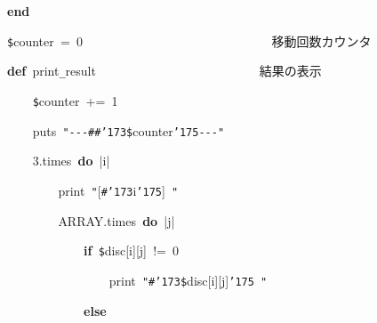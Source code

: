 \documentclass[a4paper,10pt]{article}
\def\mc{\relax}
\begin{document}
\noindent
\mbox{}\textbf{end}

\noindent
\mbox{}\hfill

\noindent
\mbox{}{\tt\$}counter{\tt\mc \ }={\tt\mc \ }0{\tt\mc \ }{\tt\mc \ }{\tt\mc \ }{\tt\mc \ }{\tt\mc \ }{\tt\mc \ }{\tt\mc \ }{\tt\mc \ }{\tt\mc \ }{\tt\mc \ }{\tt\mc \ }{\tt\mc \ }{\tt\mc \ }{\tt\mc \ }{\tt\mc \ }{\tt\mc \ }{\tt\mc \ }{\tt\mc \ }{\tt\mc \ }{\tt\mc \ }{\tt\mc \ }{\tt\mc \ }{\tt\mc \ }{\tt\mc \ }{\tt\mc \ }{\tt\mc \ }{\tt\mc \ }{\tt\mc \ }\rm\mc {\tt\#} \ 移動回数カウンタ \hfill 
\tt\mc 

\noindent
\mbox{}\hfill

\noindent
\mbox{}\textbf{def}{\tt\mc \ }print{\tt\_}result{\tt\mc \ }{\tt\mc \ }{\tt\mc \ }{\tt\mc \ }{\tt\mc \ }{\tt\mc \ }{\tt\mc \ }{\tt\mc \ }{\tt\mc \ }{\tt\mc \ }{\tt\mc \ }{\tt\mc \ }{\tt\mc \ }{\tt\mc \ }{\tt\mc \ }{\tt\mc \ }{\tt\mc \ }{\tt\mc \ }{\tt\mc \ }{\tt\mc \ }{\tt\mc \ }{\tt\mc \ }{\tt\mc \ }{\tt\mc \ }\rm\mc {\tt\#} \ 結果の表示 \hfill 
\tt\mc 

\noindent
\mbox{}{\tt\mc \ }{\tt\mc \ }{\tt\mc \ }{\tt\mc \ }{\tt\$}counter{\tt\mc \ }+={\tt\mc \ }1

\noindent
\mbox{}{\tt\mc \ }{\tt\mc \ }{\tt\mc \ }{\tt\mc \ }puts{\tt\mc \ }{\tt "}{\tt -}{\tt -}{\tt -}{\tt\#}{\tt\#}{\tt\char'173}{\tt\$}counter{\tt\char'175}{\tt -}{\tt -}{\tt -}{\tt "}

\noindent
\mbox{}{\tt\mc \ }{\tt\mc \ }{\tt\mc \ }{\tt\mc \ }3.times{\tt\mc \ }\textbf{do}{\tt\mc \ }|i|

\noindent
\mbox{}{\tt\mc \ }{\tt\mc \ }{\tt\mc \ }{\tt\mc \ }{\tt\mc \ }{\tt\mc \ }{\tt\mc \ }{\tt\mc \ }print{\tt\mc \ }{\tt "}[{\tt\#}{\tt\char'173}i{\tt\char'175}]{\tt\mc \ }{\tt "}

\noindent
\mbox{}{\tt\mc \ }{\tt\mc \ }{\tt\mc \ }{\tt\mc \ }{\tt\mc \ }{\tt\mc \ }{\tt\mc \ }{\tt\mc \ }ARRAY.times{\tt\mc \ }\textbf{do}{\tt\mc \ }|j|

\noindent
\mbox{}{\tt\mc \ }{\tt\mc \ }{\tt\mc \ }{\tt\mc \ }{\tt\mc \ }{\tt\mc \ }{\tt\mc \ }{\tt\mc \ }{\tt\mc \ }{\tt\mc \ }{\tt\mc \ }{\tt\mc \ }\textbf{if}{\tt\mc \ }{\tt\$}disc[i][j]{\tt\mc \ }!={\tt\mc \ }0

\noindent
\mbox{}{\tt\mc \ }{\tt\mc \ }{\tt\mc \ }{\tt\mc \ }{\tt\mc \ }{\tt\mc \ }{\tt\mc \ }{\tt\mc \ }{\tt\mc \ }{\tt\mc \ }{\tt\mc \ }{\tt\mc \ }{\tt\mc \ }{\tt\mc \ }{\tt\mc \ }{\tt\mc \ }print{\tt\mc \ }{\tt "}{\tt\#}{\tt\char'173}{\tt\$}disc[i][j]{\tt\char'175}{\tt\mc \ }{\tt "}

\noindent
\mbox{}{\tt\mc \ }{\tt\mc \ }{\tt\mc \ }{\tt\mc \ }{\tt\mc \ }{\tt\mc \ }{\tt\mc \ }{\tt\mc \ }{\tt\mc \ }{\tt\mc \ }{\tt\mc \ }{\tt\mc \ }\textbf{else}
\end{document}
